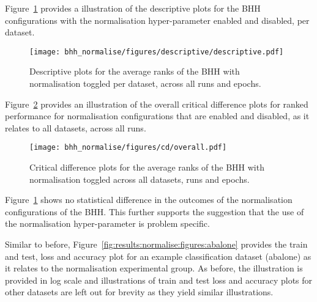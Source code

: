 Figure~\ref{fig:results:normalise:descriptive:descriptive} provides a illustration of the descriptive plots for the \acs{BHH} configurations with the normalisation hyper-parameter enabled and disabled, per dataset.

\begin{figure}[H]
	\centering
	\texttt{[image: bhh\_normalise/figures/descriptive/descriptive.pdf]}
	\caption{Descriptive plots for the average ranks of the \acs{BHH} with normalisation toggled per dataset, across all runs and epochs.}
	\label{fig:results:normalise:descriptive:descriptive}
\end{figure}

Figure~\ref{fig:results:normalise:descriptive:cd} provides an illustration of the overall critical difference plots for ranked performance for normalisation configurations that are enabled and disabled, as it relates to all datasets, across all runs.

\begin{figure}[H]
	\centering
	\texttt{[image: bhh\_normalise/figures/cd/overall.pdf]}
	\caption{Critical difference plots for the average ranks of the \acs{BHH} with normalisation toggled across all datasets, runs and epochs.}
	\label{fig:results:normalise:descriptive:cd}
\end{figure}

Figure~\ref{fig:results:normalise:descriptive:descriptive} shows no statistical difference in the outcomes of the normalisation configurations of the \acs{BHH}. This further supports the suggestion that the use of the normalisation hyper-parameter is problem specific.

Similar to before, Figure~\ref{fig:results:normalise:figures:abalone} provides the train and test, loss and accuracy plot for an example classification dataset (abalone) as it relates to the normalisation experimental group. As before, the illustration is provided in log scale and illustrations of train and test loss and accuracy plots for other datasets are left out for brevity as they yield similar illustrations.

